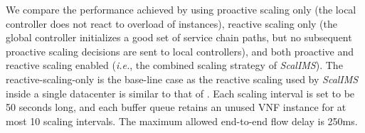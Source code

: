 We compare the performance achieved by using proactive scaling only (the local controller does not react to overload of instances), reactive scaling only (the global controller initializes a good set of service chain paths, but no subsequent proactive scaling decisions are sent to local controllers), and both proactive and reactive scaling enabled ({\em i.e.}, the combined scaling strategy of \textit{ScalIMS}). The reactive-scaling-only is the base-line case as the reactive scaling used by \textit{ScalIMS} inside a single datacenter is similar to that of \cite{gember2012stratos, palkar2015e2}. Each scaling interval is set to be 50 seconds long, and each buffer queue retains an unused VNF instance for at most 10 scaling intervals. The maximum allowed end-to-end flow delay is 250ms.

